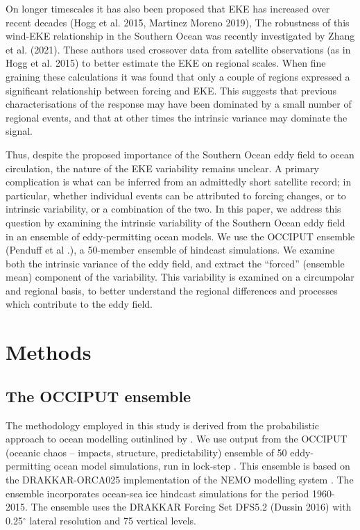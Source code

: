 \documentclass{agujournal2019}
\begin{document}
On longer timescales it has also been proposed that EKE has increased over recent decades (Hogg et al. 2015, Martinez Moreno 2019),
The robustness of this wind-EKE relationship in the Southern Ocean was recently investigated by Zhang et al. (2021).
These authors used crossover data from satellite observations (as in Hogg et al. 2015) to better estimate the EKE on regional scales. 
When fine graining these calculations it was found that only a couple of regions expressed a significant relationship between forcing and EKE.
This suggests that previous characterisations of the response may have been dominated by a small number of regional events, and that at other times the intrinsic variance may dominate the signal.

Thus, despite the proposed importance of the Southern Ocean eddy field to ocean circulation, the nature of the EKE variability remains unclear.
A primary complication is what can be inferred from an admittedly short satellite record; in particular, whether individual events can be attributed to forcing changes, or to intrinsic variability, or a combination of the two.
In this paper, we address this question by examining the intrinsic variability of the Southern Ocean eddy field in an ensemble of eddy-permitting  ocean models.
We use the OCCIPUT ensemble (Penduff et al .), a 50-member ensemble of hindcast simulations.
We examine both the intrinsic variance of the eddy field, and extract the ``forced'' (ensemble mean) component of the variability.
This variability is examined on a circumpolar and regional basis, to better understand the regional differences and processes which contribute to the eddy field.



\section{Methods}

\subsection{The OCCIPUT ensemble}

The methodology employed in this study is derived from the probabilistic approach to ocean modelling outinlined by \citet{Bessieres2017}.
We use output from the OCCIPUT (oceanic chaos – impacts, structure, predictability) ensemble of 50 eddy-permitting ocean model simulations, run in lock-step \citep{Leroux2018}.
This ensemble is based on the DRAKKAR-ORCA025 \citep[e.g.][]{Barnier2006} implementation of the NEMO modelling system \citep{Madec2012}.
The ensemble incorporates ocean-sea ice hindcast simulations for the period 1960-2015.
The ensemble uses the DRAKKAR Forcing Set DFS5.2 (Dussin 2016) with  0.25$^\circ$ lateral resolution and 75 vertical levels.
\end{document}
